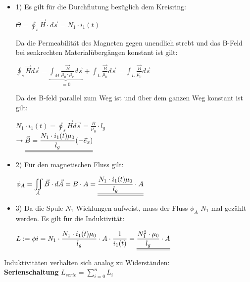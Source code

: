 \iend
\newpage


\beginbsp
\begin{itemize}
\item 1) Es gilt für die Durchflutung bezüglich dem Kreisring:
			\begin{center}
				$\Theta =  \oint_s \vec{H}\cdot d\vec{s} = N_1\cdot i_1(t)$
			\end{center}
			Da die Permeabilität des Magneten gegen unendlich strebt und das B-Feld bei senkrechten Materialübergängen konstant ist gilt: \\

			\begin{center}
			$\displaystyle \oint_s \vec{H} d\vec{s} = \underbrace{\int_{M} \frac{\vec{B}}{\mu_0 \cdot \mu_r} d\vec{s}}_{=0} + \int_{L} \frac{\vec{B}}{\mu_0} d\vec{s} = \int_{L} \frac{\vec{B}}{\mu_0} d\vec{s} $
		\end{center}
		Da des B-feld parallel zum Weg ist und über dem ganzen Weg konstant ist gilt:
		\begin{center}
				$\displaystyle N_1 \cdot i_1(t) = \displaystyle \oint_s \vec{H} d\vec{s} = \frac{B}{\mu_0} \cdot l_g$ \\
				$\displaystyle \rightarrow \underline{\underline{\vec{B} = \frac{N_1 \cdot i_1(t) \mu_0}{l_g} (-\vec{e}_x)}}$
		\end{center}

		\item 2) Für den magnetischen Fluss gilt:
		\begin{center}
				$\displaystyle \phi_A = \iint_A \vec{B} \cdot d\vec{A} = B \cdot A =\underline{\underline{\frac{N_1 \cdot i_1(t) \mu_0}{l_g} \cdot A}}$
		\end{center}

		\item 3) Da die Spule $N_1$ Wicklungen aufweist, muss der Fluss $\phi_A$ $N_1$ mal gezählt werden. Es gilt für die Induktivität:
		\begin{center}
				$ \displaystyle L:= {\phi}{i} = N_1 \cdot  \frac{N_1 \cdot i_1(t) \mu_0}{l_g} \cdot A \cdot \frac{1}{i_1(t)} =  \underline{\underline{\frac{N_1^2 \cdot \mu_0}{l_g} \cdot A}}$
		\end{center}
\end{itemize}

\iend




	 \beginip
	 	Induktivitäten verhalten sich analog zu Widerständen: \\
		\textbf{Serienschaltung}
		\formulaBegin
		$ L_{serie} = \sum_{i=0}^n L_i $
		\formulaEnd

